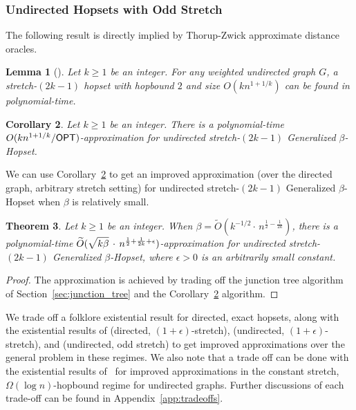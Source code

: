 \documentclass{article}
\newtheorem{theorem}{Theorem}[section]
\newtheorem{corollary}[theorem]{Corollary}
\newtheorem{lemma}[theorem]{Lemma}
\theoremstyle{definition}
\theoremstyle{remark}
\def\be    {\beta}
\def\opt {{\sf OPT}}
\def\hopset {{\sc Generalized $\beta$-Hopset}}
\begin{document}
\subsubsection{Undirected Hopsets with Odd Stretch}

The following result is directly implied by Thorup-Zwick approximate distance oracles.

\begin{lemma}[\hspace{1sp}\cite{TZ05}]
    Let $k \geq 1$ be an integer. For any weighted undirected graph $G$, a stretch-$(2k-1)$ hopset with hopbound $2$ and size $O(kn^{1+1/k})$ can be found in polynomial-time.
\end{lemma}
\begin{corollary} \label{cor:existential_undir_k}
    Let $k \geq 1$ be an integer. There is a polynomial-time $O(kn^{1+1/k} / {\opt})$-approximation for undirected stretch-$(2k-1)$ {\hopset}.
\end{corollary}

We can use Corollary~\ref{cor:existential_undir_k} to get an improved approximation (over the directed graph, arbitrary stretch setting) for undirected stretch-$(2k-1)$ {\hopset} when $\be$ is relatively small.

\begin{theorem} \label{thm:undir_gen_stretch}
    Let $k \geq 1$ be an integer. When $\be = \widetilde{O}(k^{-1/2} \cdot \, n^{\frac{1}{2} - \frac{1}{2k}}) $, there is a polynomial-time $\widetilde{O}(\sqrt{k \be \vphantom{\be^k}} \, \cdot \, n^{\frac{1}{2} + \frac{1}{2k} + \epsilon})$-approximation for undirected stretch-$(2k-1)$ {\hopset}, where $\epsilon > 0$ is an arbitrarily small constant.
\end{theorem}
\begin{proof}
    The approximation is achieved by trading off the junction tree algorithm of Section~\ref{sec:junction_tree} and the Corollary~\ref{cor:existential_undir_k} algorithm.
\end{proof}

\else 
We trade off a folklore existential result for directed, exact hopsets, along with the existential results of \cite{BW23} (directed, $(1+\epsilon)$-stretch), \cite{elkin2019RNC} (undirected, $(1+\epsilon)$-stretch), and \cite{TZ05} (undirected, odd stretch) to get improved approximations over the general problem in these regimes. We also note that a trade off can be done with the existential results of~\cite{BP2020} for improved approximations in the constant stretch, $\Omega(\log n)$-hopbound regime for undirected graphs. Further discussions of each trade-off can be found in Appendix~\ref{app:tradeoffs}.
\end{document}
